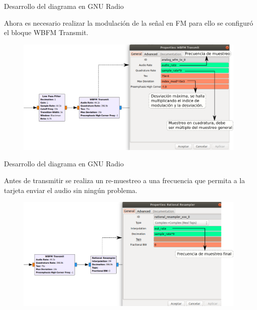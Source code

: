 \begin{frame}{Desarrollo del diagrama en GNU Radio}

Ahora es necesario realizar la modulación de la señal en FM para ello se configuró el bloque WBFM Transmit.

\begin{figure}[H]
\centering
\vspace{-3mm}
\includegraphics[width=\textwidth]{parte3/lab14/pdf/Lab14_6.pdf}
\end{figure}


\end{frame}

\begin{frame}{Desarrollo del diagrama en GNU Radio}

Antes de transmitir se realiza un re-muestreo a una frecuencia que permita a la tarjeta enviar el audio sin ningún problema.

\begin{figure}[H]
\centering
\vspace{-3mm}
\includegraphics[width=\textwidth]{parte3/lab14/pdf/Lab14_7.pdf}
\end{figure}


\end{frame}

